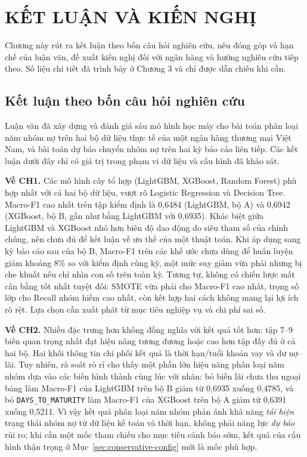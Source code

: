 \chapter{KẾT LUẬN VÀ KIẾN NGHỊ}

Chương này rút ra kết luận theo bốn câu hỏi nghiên cứu, nêu đóng góp và hạn chế của luận văn, đề xuất kiến nghị đối với ngân hàng và hướng nghiên cứu tiếp theo. Số liệu chi tiết đã trình bày ở Chương 3 và chỉ được dẫn chiếu khi cần.

\section{Kết luận theo bốn câu hỏi nghiên cứu}

Luận văn đã xây dựng và đánh giá sáu mô hình học máy cho bài toán phân loại năm nhóm nợ trên hai bộ dữ liệu thực tế của một ngân hàng thương mại Việt Nam, và bài toán dự báo chuyển nhóm nợ trên hai kỳ báo cáo liên tiếp. Các kết luận dưới đây chỉ có giá trị trong phạm vi dữ liệu và cấu hình đã khảo sát.

\noindent\textbf{Về CH1.} Các mô hình cây tổ hợp (LightGBM, XGBoost, Random Forest) phù hợp nhất với cả hai bộ dữ liệu, vượt rõ Logistic Regression và Decision Tree. Macro-F1 cao nhất trên tập kiểm định là 0,6484 (LightGBM, bộ A) và 0,6942 (XGBoost, bộ B, gần như bằng LightGBM với 0,6935). Khác biệt giữa LightGBM và XGBoost nhỏ hơn biên độ dao động do siêu tham số của chính chúng, nên chưa đủ để kết luận về ưu thế của một thuật toán. Khi áp dụng sang kỳ báo cáo sau của bộ B, Macro-F1 trên các khế ước chưa dùng để huấn luyện giảm khoảng 8\% so với kiểm định cùng kỳ, một mức suy giảm vừa phải nhưng bị che khuất nếu chỉ nhìn con số trên toàn kỳ. Tương tự, không có chiến lược mất cân bằng tốt nhất tuyệt đối: SMOTE vừa phải cho Macro-F1 cao nhất, trọng số lớp cho Recall nhóm hiếm cao nhất, còn kết hợp hai cách không mang lại lợi ích rõ rệt. Lựa chọn cần xuất phát từ mục tiêu nghiệp vụ và chi phí sai số.

\noindent\textbf{Về CH2.} Nhiều đặc trưng hơn không đồng nghĩa với kết quả tốt hơn: tập 7--9 biến quan trọng nhất đạt hiệu năng tương đương hoặc cao hơn tập đầy đủ ở cả hai bộ. Hai khối thông tin chi phối kết quả là thời hạn/tuổi khoản vay và dư nợ--lãi. Tuy nhiên, rà soát rò rỉ cho thấy một phần lớn hiệu năng phân loại năm nhóm dựa vào các biến hình thành cùng lúc với nhãn: bỏ biến lãi chưa thu ngoại bảng làm Macro-F1 của LightGBM trên bộ B giảm từ 0,6935 xuống 0,4785, và bỏ \mbox{\texttt{DAYS\_TO\_MATURITY}} làm Macro-F1 của XGBoost trên bộ A giảm từ 0,6391 xuống 0,5211. Vì vậy kết quả phân loại năm nhóm phản ánh khả năng \emph{tái hiện} trạng thái nhóm nợ từ dữ liệu kế toán và thời hạn, không phải năng lực \emph{dự báo} rủi ro; khi cần một mốc tham chiếu cho mục tiêu cảnh báo sớm, kết quả của cấu hình thận trọng ở Mục~\ref{sec:conservative-config} mới là mốc phù hợp.


